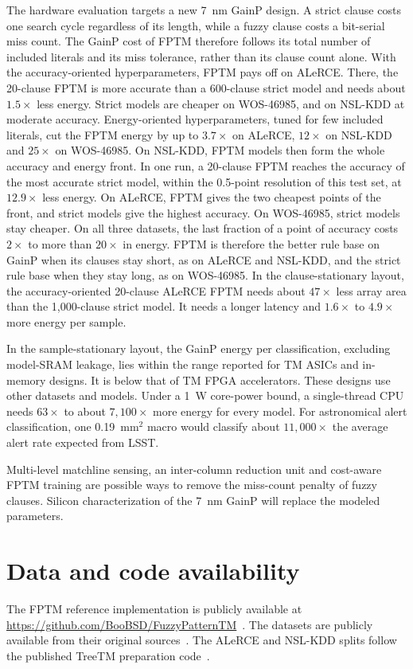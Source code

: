 \documentclass[preprint,review,12pt]{elsarticle}
\newcommand{\gainp}{GainP}
\newcommand{\hyp}[1]{#1}   %
\newcommand{\wosnew}[1]{#1}   %
\begin{document}
\wosnew{The hardware evaluation targets a new 7~nm \gainp{} design.
A strict clause costs one search cycle regardless of its length, while a fuzzy clause costs a bit-serial miss count.
The \gainp{} cost of FPTM therefore follows its total number of included literals and its miss tolerance, rather than its clause count alone.
With the accuracy-oriented hyperparameters, FPTM pays off on ALeRCE. There, the 20-clause FPTM is more accurate than a 600-clause strict model and needs} \hyp{about $1.5\times$ less energy}. \wosnew{Strict models are cheaper on WOS-46985, and on NSL-KDD at moderate accuracy.
Energy-oriented hyperparameters, tuned for few included literals, cut the FPTM energy by up to $3.7\times$ on ALeRCE, $12\times$ on NSL-KDD and $25\times$ on WOS-46985.
On NSL-KDD, FPTM models then form the whole accuracy and energy front. In one run, a 20-clause FPTM reaches the accuracy of the most accurate strict model, within the 0.5-point resolution of this test set, at $12.9\times$ less energy.
On ALeRCE, FPTM gives the two cheapest points of the front, and strict models give the highest accuracy. On WOS-46985, strict models stay cheaper.
On all three datasets, the last fraction of a point of accuracy costs $2\times$ to more than $20\times$ in energy.
FPTM is therefore the better rule base on \gainp{} when its clauses stay short, as on ALeRCE and NSL-KDD, and the strict rule base when they stay long, as on WOS-46985.
In the clause-stationary layout, the accuracy-oriented 20-clause ALeRCE FPTM needs about $47\times$ less array area than the 1,000-clause strict model. It needs a longer latency and} \hyp{$1.6\times$ to $4.9\times$} \wosnew{more energy per sample.}

\hyp{In the sample-stationary layout, the \gainp{} energy per classification, excluding model-SRAM leakage, lies within the range reported for TM ASICs and in-memory designs. It is below that of TM FPGA accelerators. These designs use other datasets and models. Under a 1~W core-power bound, a single-thread CPU needs $63\times$ to about $7{,}100\times$ more energy for every model. For astronomical alert classification, one 0.19~mm$^2$ macro would classify about $11{,}000\times$ the average alert rate expected from LSST.}

\hyp{Multi-level matchline sensing, an inter-column reduction unit and cost-aware FPTM training are possible ways to remove the miss-count penalty of fuzzy clauses. Silicon characterization of the 7~nm \gainp{} will replace the modeled parameters.}

\section*{Data and code availability}
The FPTM reference implementation is publicly available at \url{https://github.com/BooBSD/FuzzyPatternTM}~\cite{hnilov2025code}. The datasets are publicly available from their original sources~\cite{kowsari2017hdltex,sanchezsaez2021alerce,tavallaee2009nslkdd}. The ALeRCE and NSL-KDD splits follow the published TreeTM preparation code~\cite{treetm2026repo}.
\end{document}
